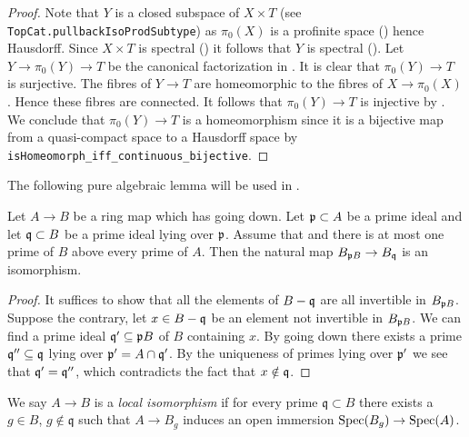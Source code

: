\begin{proof}
  Note that $Y$ is a closed subspace of $X \times T$ (see \verb`TopCat.pullbackIsoProdSubtype`) as $\pi_0(X)$ is a profinite space () hence Hausdorff. Since $X \times T$ is spectral () it follows that $Y$ is spectral (). Let $Y \to \pi_0(Y) \to T$ be the canonical factorization in . It is clear that $\pi_0(Y) \to T$ is surjective. The fibres of $Y \to T$ are homeomorphic to the fibres of $X \to \pi_0(X)$. Hence these fibres are connected. It follows that $\pi_0(Y) \to T$ is injective by . We conclude that $\pi_0(Y) \to T$ is a homeomorphism since it is a bijective map from a quasi-compact space to a Hausdorff space by \verb`isHomeomorph_iff_continuous_bijective`.
\end{proof}

The following pure algebraic lemma will be used in .

\begin{lemma}
  \label{thm:localization-isom-of-going-down}
  Let $A \to B$ be a ring map which has going down. Let ${\mathfrak{p}} \subset A$ be a prime ideal and let ${\mathfrak{q}} \subset B$ be a prime ideal lying over ${\mathfrak{p}}$. Assume that and there is at most one prime of $B$ above every prime of $A$. Then the natural map $B_{{\mathfrak{p}} B} \to B_{{\mathfrak{q}}}$ is an isomorphism.
\end{lemma}

\begin{proof}
  It suffices to show that all the elements of $B - {\mathfrak{q}}$ are all invertible in $B_{{\mathfrak{p}} B}$. Suppose the contrary, let $x \in B - {\mathfrak{q}}$ be an element not invertible in $B_{{\mathfrak{p}} B}$. We can find a prime ideal ${\mathfrak{q}}' \subseteq {\mathfrak{p}} B$ of $B$ containing $x$. By going down there exists a prime ${\mathfrak{q}}'' \subseteq {\mathfrak{q}}$ lying over ${\mathfrak{p}}' = A \cap {\mathfrak{q}}'$. By the uniqueness of primes lying over ${\mathfrak{p}}'$ we see that ${\mathfrak{q}}' = {\mathfrak{q}}''$, which contradicts the fact that $x \notin {\mathfrak{q}}$.
\end{proof}

\begin{definition}
  \label{def:local-isomorphism}
  \leanok
  We say $A \to B$ is a \emph{local isomorphism} if for every prime $\mathfrak{q} \subset B$ there exists a $g \in B$, $g \notin \mathfrak{q}$ such that $A \to B_g$ induces an open immersion $\operatorname{Spec} (B_g) \to \operatorname{Spec} (A)$.
\end{definition}

